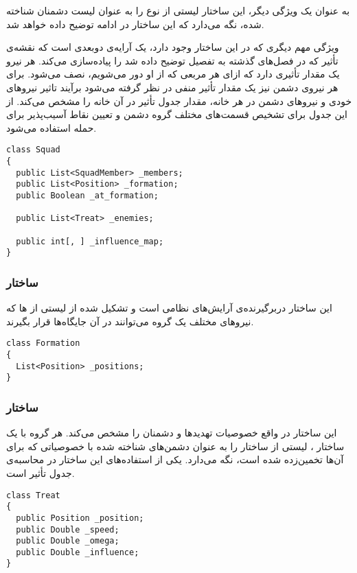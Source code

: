 به عنوان یک ویژگی دیگر، این ساختار لیستی از نوع  را به عنوان لیست دشمنان شناخته شده، نگه می‌دارد
که این ساختار در ادامه توضیح داده خواهد شد.

ویژگی مهم دیگری که در این ساختار وجود دارد، یک آرایه‌ی دوبعدی است که نقشه‌ی تأثیر که در فصل‌های گذشته
به تفصیل توضیح داده شد را پیاده‌سازی می‌کند. هر نیرو یک مقدار تأثیری دارد که ازای هر مربعی که از او دور می‌شویم، نصف می‌شود. برای هر نیروی دشمن نیز یک مقدار تأثیر منفی در نظر گرفته می‌شود برآیند تاثیر نیروهای
خودی و نیروهای دشمن در هر خانه، مقدار جدول تأثیر در آن خانه را مشخص می‌کند. از این جدول برای تشخیص
قسمت‌های مختلف گروه دشمن و تعیین نقاط آسیب‌پذیر برای حمله استفاده می‌شود.
\begin{latin}
{\linespread{1.2}
{\inconsolata
\lstset{language=Java}
\begin{lstlisting}
class Squad
{
  public List<SquadMember> _members;
  public List<Position> _formation;
  public Boolean _at_formation;

  public List<Treat> _enemies;

  public int[, ] _influence_map;
}
\end{lstlisting}
}
}
\end{latin}

\subsubsection{ساختار }
این ساختار دربرگیرنده‌ی آرایش‌های نظامی است و تشکیل شده از لیستی از ها که نیروهای مختلف یک گروه
می‌توانند در آن جایگاه‌ها قرار بگیرند.
\begin{latin}
{\linespread{1.2}
{\inconsolata
\lstset{language=Java}
\begin{lstlisting}
class Formation
{
  List<Position> _positions;
}
\end{lstlisting}
}
}
\end{latin}

\subsubsection{ساختار }
این ساختار در واقع خصوصیات تهدیدها و دشمنان را مشخص می‌کند. هر گروه با یک ساختار ، لیستی از
ساختار  را به عنوان دشمن‌های شناخته شده با خصوصیاتی که برای آن‌ها تخمین‌زده شده است، نگه می‌دارد.
یکی از استفاده‌های این ساختار در محاسبه‌ی جدول تأثیر است.
\begin{latin}
{\linespread{1.2}
{\inconsolata
\lstset{language=Java}
\begin{lstlisting}
class Treat
{
  public Position _position;
  public Double _speed;
  public Double _omega;
  public Double _influence;
}
\end{lstlisting}
}
}
\end{latin}

